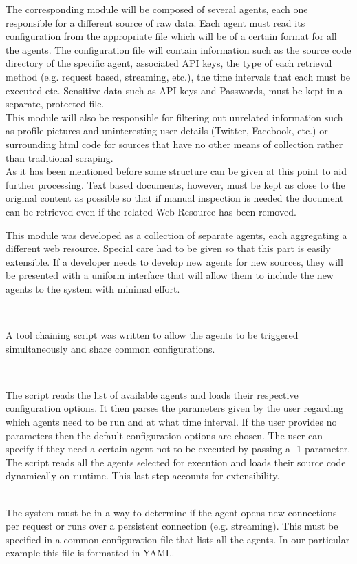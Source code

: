 \documentclass[12pt]{article}
\newcounter{subsubsubsection}[subsubsection]
\begin{document}

The corresponding module will be composed of several agents, each one responsible for a different source of raw data. Each agent must read its configuration from the appropriate file which will be of a certain format for all the agents. The configuration file will contain information such as the source code directory of the specific agent, associated API keys, the type of each retrieval method (e.g. request based, streaming, etc.), the time intervals that each must be executed etc. Sensitive data such as API keys and Passwords, must be kept in a separate, protected file.
\hfill \break \\
This module will also be responsible for filtering out unrelated information such as profile pictures and uninteresting user details (Twitter, Facebook, etc.) or surrounding html code for sources that have no other means of collection rather than traditional scraping.
\hfill \break \\
As it has been mentioned before some structure can be given at this point to aid further processing. Text based documents, however, must be kept as close to the original content as possible so that if manual inspection is needed the document can be retrieved even if the related Web Resource has been removed.


\parbox{\linewidth}{
This module was developed as a collection of separate agents, each aggregating a different web resource. Special care had to be given so that this part is easily extensible. If a developer needs to develop new agents for new sources, they will be presented with a uniform interface that will allow them to include the new agents to the system with minimal effort. 
}
\hfill \break \\
\parbox{\linewidth}{
A tool chaining script was written to allow the agents to be triggered simultaneously and share common configurations. 
}
\hfill \break \\
\parbox{\linewidth}{
The script reads the list of available agents and loads their respective configuration options. It then parses the parameters given by the user regarding which agents need to be run and at what time interval. If the user provides no parameters then the default configuration options are chosen. The user can specify if they need a certain agent not to be executed by passing a -1 parameter. The script reads all the agents selected for execution and loads their source code dynamically on runtime. This last step accounts for extensibility. 
}
\hfill \break \\
The system must be in a way to determine if the agent opens new connections per request or runs over a persistent connection (e.g. streaming). This must be specified in a common configuration file that lists all the agents. In our particular example this file is formatted in YAML. 
\newpage
\end{document}
